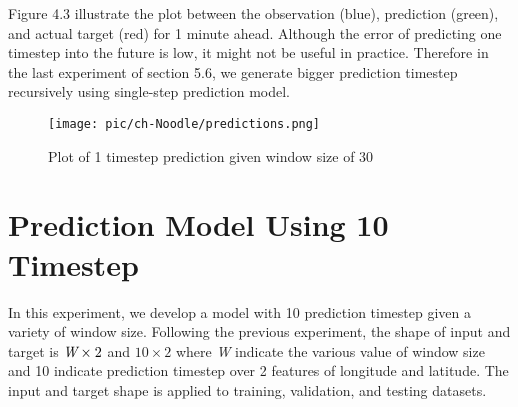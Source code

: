 \begin{table}[]
\centering
\caption{Model performance with dynamic window size and 1 prediction timestep}
\label{tab:target1}
\end{table}

Figure 4.3 illustrate the plot between the observation (blue), prediction (green), and actual target (red) for 1 minute ahead. Although the error of predicting one timestep into the future is low, it might not be useful in practice. Therefore in the last experiment of section 5.6, we generate bigger prediction timestep recursively using single-step prediction model.

\begin{figure}[b!]
    \centering
    \texttt{[image: pic/ch-Noodle/predictions.png]}
    \caption{Plot of 1 timestep prediction given window size of 30}
    \label{fig:predict1}
\end{figure}

\section{Prediction Model Using 10 Timestep}
In this experiment, we develop a model with 10 prediction timestep given a variety of window size. Following the previous experiment, the shape of input and target is $\emph{W}\times2$ and $10\times2$ where \emph{W} indicate the various value of window size and 10 indicate prediction timestep over 2 features of longitude and latitude. The input and target shape is applied to training, validation, and testing datasets.

